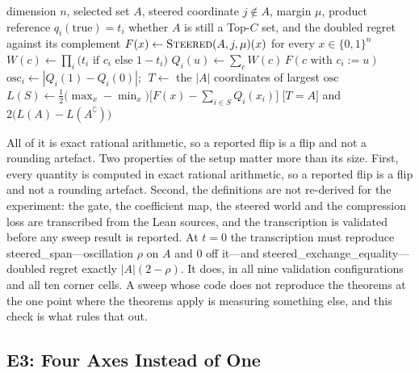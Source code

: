 \documentclass[conference]{IEEEtran}
\theoremstyle{definition}
\newcommand{\lean}[1]{\textsf{\footnotesize #1}}
\begin{document}
\begin{algorithm}[htbp]
\caption{Evaluating the construction under one reference}
\label{alg:d6-sweep}
\begin{algorithmic}[1]
\REQUIRE dimension $n$, selected set $A$, steered coordinate $j\notin A$, margin $\mu$,
         product reference $q_{i}(\mathrm{true})=t_{i}$
\ENSURE whether $A$ is still a Top-$C$ set, and the doubled regret against its complement
\STATE $F(x)\leftarrow\textsc{Steered}(A,j,\mu)(x)$ for every $x\in\{0,1\}^{n}$
\STATE $W(c)\leftarrow\prod_{i}\bigl(t_{i}\text{ if }c_{i}\text{ else }1-t_{i}\bigr)$
  \STATE $Q_{i}(u)\leftarrow\sum_{c}W(c)\,F(c\text{ with }c_{i}:=u)$
\ENDFOR
\STATE $\mathrm{osc}_{i}\leftarrow|Q_{i}(1)-Q_{i}(0)|$;
       $\;T\leftarrow$ the $|A|$ coordinates of largest $\mathrm{osc}$
\STATE $L(S)\leftarrow\tfrac12\bigl(\max_{x}-\min_{x}\bigr)
       \bigl[F(x)-\sum_{i\in S}Q_{i}(x_{i})\bigr]$
\RETURN $\bigl[T=A\bigr]$ and $2\bigl(L(A)-L(A^{\complement})\bigr)$
\end{algorithmic}
\end{algorithm}

\noindent All of it is exact rational arithmetic, so a reported flip is a flip and not a
rounding artefact. Two properties of the setup matter more than its size. First, every quantity is computed in
exact rational arithmetic, so a reported flip is a flip and not a rounding artefact. Second,
the definitions are not re-derived for the experiment: the gate, the coefficient map, the
steered world and the compression loss are transcribed from the Lean sources, and the
transcription is validated before any sweep result is reported. At $t=0$ the transcription
must reproduce \lean{steered\_span}---oscillation $\rho$ on $A$ and $0$ off it---and
\lean{steered\_exchange\_equality}---doubled regret exactly $|A|(2-\rho)$. It does, in all
nine validation configurations and all ten corner cells. A sweep whose code does not
reproduce the theorems at the one point where the theorems apply is measuring something else,
and this check is what rules that out.

\subsection{E3: Four Axes Instead of One}
\label{sec:d6-e3}
\end{document}
